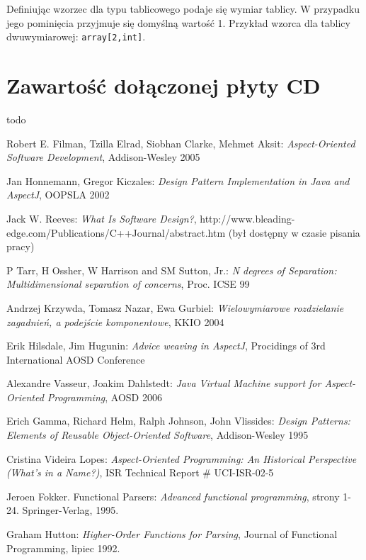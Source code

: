 \documentclass[a4paper,12pt]{mwbk}
\begin{document}
Definiując wzorzec dla typu tablicowego podaje się wymiar tablicy. W przypadku
jego pominięcia przyjmuje się domyślną wartość 1. Przykład wzorca dla tablicy
dwuwymiarowej: \lstinline!array[2,int]!.

\chapter{Zawartość dołączonej płyty CD}

todo

\begin{thebibliography}{99}
		 
Robert E. Filman, Tzilla Elrad, Siobhan Clarke, Mehmet Aksit: {\it Aspect-Oriented Software Development}, Addison-Wesley 2005
  
Jan Honnemann, Gregor Kiczales: {\it Design Pattern Implementation in Java and AspectJ}, OOPSLA 2002
  
Jack W. Reeves: {\it What Is Software Design?}, http://www.bleading-edge.com/Publications/C++Journal/abstract.htm (był dostępny w czasie pisania pracy)

P Tarr, H Ossher, W Harrison and SM Sutton, Jr.: {\it N degrees of Separation: Multidimensional separation of concerns}, Proc. ICSE 99

Andrzej Krzywda, Tomasz Nazar, Ewa Gurbiel: {\it Wielowymiarowe rozdzielanie zagadnień, a podejście komponentowe}, KKIO 2004

Erik Hilsdale, Jim Hugunin: {\it Advice weaving in AspectJ}, Procidings of 3rd International AOSD Conference

Alexandre Vasseur, Joakim Dahlstedt: {\it Java Virtual Machine support for Aspect-Oriented Programming}, AOSD 2006

Erich Gamma, Richard Helm, Ralph Johnson, John Vlissides: {\it Design Patterns: Elements of Reusable Object-Oriented Software}, Addison-Wesley 1995

Cristina Videira Lopes: {\it Aspect-Oriented Programming: An Historical Perspective (What's in a Name?)}, ISR Technical Report \# UCI-ISR-02-5

Jeroen Fokker. Functional Parsers: {\it Advanced functional programming}, strony 1-24. Springer-Verlag, 1995. 

Graham Hutton: {\it Higher-Order Functions for Parsing}, Journal of Functional Programming, lipiec 1992.


\end{thebibliography}
\end{document}
